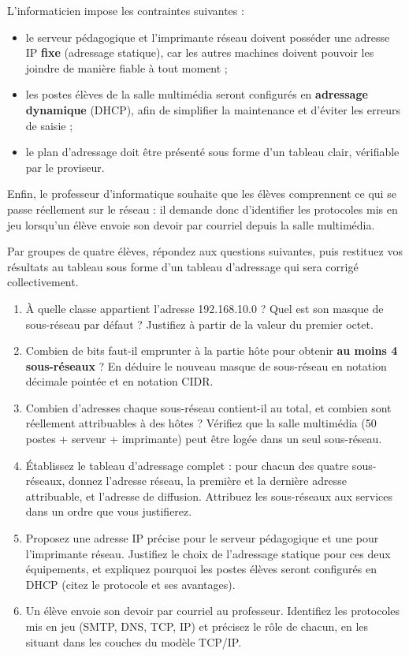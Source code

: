 \documentclass[11pt]{article}
\newcounter{popsec}
\newcounter{popsub}
\newcommand{\courssub}[1]{%
  \stepcounter{popsub}%
  \par\vspace{9pt}\noindent{\popxbold\fontsize{11.5}{13}\selectfont\color{popink}{\color{poporange}\thepopsec.\thepopsub}\hspace{6pt}#1}\par\nopagebreak\vspace{4pt}
}
\begin{document}
L'informaticien impose les contraintes suivantes :

\begin{itemize}
\item le serveur pédagogique et l'imprimante réseau doivent posséder une adresse IP \textbf{fixe} (adressage statique), car les autres machines doivent pouvoir les joindre de manière fiable à tout moment ;
\item les postes élèves de la salle multimédia seront configurés en \textbf{adressage dynamique} (DHCP), afin de simplifier la maintenance et d'éviter les erreurs de saisie ;
\item le plan d'adressage doit être présenté sous forme d'un tableau clair, vérifiable par le proviseur.
\end{itemize}

Enfin, le professeur d'informatique souhaite que les élèves comprennent ce qui se passe réellement sur le réseau : il demande donc d'identifier les protocoles mis en jeu lorsqu'un élève envoie son devoir par courriel depuis la salle multimédia.

\courssub{Consignes}

Par groupes de quatre élèves, répondez aux questions suivantes, puis restituez vos résultats au tableau sous forme d'un tableau d'adressage qui sera corrigé collectivement.

\begin{enumerate}
\item À quelle classe appartient l'adresse 192.168.10.0 ? Quel est son masque de sous-réseau par défaut ? Justifiez à partir de la valeur du premier octet.
\item Combien de bits faut-il emprunter à la partie hôte pour obtenir \textbf{au moins 4 sous-réseaux} ? En déduire le nouveau masque de sous-réseau en notation décimale pointée et en notation CIDR.
\item Combien d'adresses chaque sous-réseau contient-il au total, et combien sont réellement attribuables à des hôtes ? Vérifiez que la salle multimédia (50 postes + serveur + imprimante) peut être logée dans un seul sous-réseau.
\item Établissez le tableau d'adressage complet : pour chacun des quatre sous-réseaux, donnez l'adresse réseau, la première et la dernière adresse attribuable, et l'adresse de diffusion. Attribuez les sous-réseaux aux services dans un ordre que vous justifierez.
\item Proposez une adresse IP précise pour le serveur pédagogique et une pour l'imprimante réseau. Justifiez le choix de l'adressage statique pour ces deux équipements, et expliquez pourquoi les postes élèves seront configurés en DHCP (citez le protocole et ses avantages).
\item Un élève envoie son devoir par courriel au professeur. Identifiez les protocoles mis en jeu (SMTP, DNS, TCP, IP) et précisez le rôle de chacun, en les situant dans les couches du modèle TCP/IP.
\end{enumerate}
\end{document}
